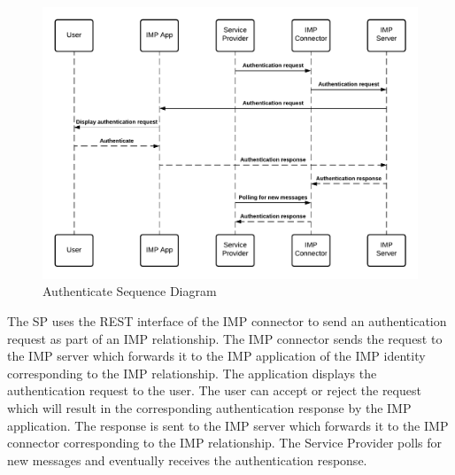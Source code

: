 \begin{figure}[h!]
    \centering
    \includegraphics[scale=0.6]{Diagrams/IMP Use Case Authenticate Sequence Diagram.pdf}
    \caption{Authenticate Sequence Diagram}
    \label{imp:authenticate}
\end{figure}

The SP uses the REST interface of the IMP connector to send an authentication request as part of an IMP relationship. The IMP connector sends the request to the IMP server which forwards it to the IMP application of the IMP identity corresponding to the IMP relationship. The application displays the authentication request to the user. The user can accept or reject the request which will result in the corresponding authentication response by the IMP application. The response is sent to the IMP server which forwards it to the IMP connector corresponding to the IMP relationship. The Service Provider polls for new messages and eventually receives the authentication response.